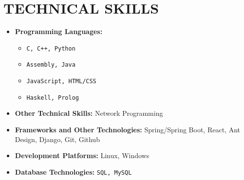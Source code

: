\section{TECHNICAL SKILLS}

\begin{multicols}{2}
  \begin{itemize}[leftmargin=0.25in, itemsep=1pt]
    \item \textbf{Programming Languages:} 
      \begin{itemize}[label={-}, leftmargin=0.2in]
        \item \texttt{C, C++, Python}
        \item \texttt{Assembly, Java}
        \item \texttt{JavaScript, HTML/CSS}
        \item \texttt{Haskell, Prolog}
      \end{itemize}
    \vspace{\fill}
  
    \item \textbf{Other Technical Skills:}
      Network Programming
  
    \item \textbf{Frameworks and Other Technologies:}
      Spring/Spring Boot, React, Ant Design, Django, Git, Github
    
    \item \textbf{Development Platforms:}
      Linux, Windows
    
    \item \textbf{Database Technologies:} 
      \texttt{SQL, MySQL}
  \end{itemize}
\end{multicols}
